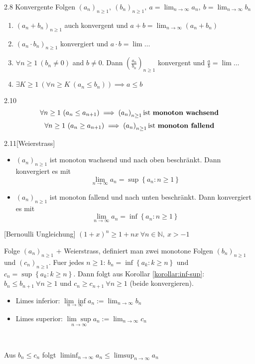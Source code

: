 \documentclass[8pt,a4paper,twocolumn,table]{extarticle}
\newcommand{\N}{\mathbb{N}}
\newcommand{\seq}[1]{\left( #1_n \right)_{n \ge 1}}
\begin{document}
\begin{satz}{2.8}
    Konvergente Folgen $\seq{a},\ \seq{b},\ a = \lim_{n \to \infty} a_n,\ b = \lim_{n \to \infty} b_n$
    \begin{enumerate}
        \item $(a_n + b_n)_{n \ge 1}$ auch konvergent und $a + b = \lim_{n \to \infty} (a_n + b_n)$
        \item $(a_n \cdot b_n)_{n \ge 1}$ konvergiert und $a \cdot b = \lim \dots$
        \item $\forall n \ge 1\ (b_n \ne 0)$ and $b \ne 0$. Dann $\left(\frac{a_n}{b_n}\right)_{n \ge 1}$ konvergent und $\frac{a}{b} = \lim \dots$
        \item $\exists K \ge 1\ \left(\forall n \ge K\ (a_n \le b_n)\right) \implies a \le b$
    \end{enumerate}
\end{satz}

\begin{definition}{2.10}
    \[\forall n \ge 1\ (a_n \le a_{n + 1}) \implies \seq{a} \mbox{ist \textbf{monoton wachsend}}\]
    \[\forall n \ge 1\ (a_n \ge a_{n + 1}) \implies \seq{a} \mbox{ist \textbf{monoton fallend}}\]
\end{definition}

\begin{satz}{2.11}[Weierstrass]
    \begin{itemize}
        \item $\seq{a}$ ist monoton wachsend und nach oben beschränkt. Dann konvergiert es mit \[ \lim_{n \to \infty} a_n = \sup \left\{ a_n : n \ge 1 \right\} \]
        \item $\seq{a}$ ist monoton fallend und nach unten beschränkt. Dann konvergiert es mit \[ \lim_{n \to \infty} a_n = \inf \left\{ a_n : n \ge 1 \right\} \]
    \end{itemize}
\end{satz}

\begin{lemma}{}[Bernoulli Ungleichung]
    $(1 + x)^n \ge 1 + nx\ \forall n \in \N,\ x > -1$
\end{lemma}

\begin{definition}
    Folge $\seq{a}$ + Weierstrass, definiert man zwei monotone Folgen $\seq{b}$ und $\seq{c}$.
    Fuer jedes $n \ge 1$: $b_n = \inf \left\{ a_k : k \ge n \right\}$ und $c_n = \sup \left\{ a_k : k \ge n \right\}$.
    Dann folgt aus Korollar \ref{korollar:inf-sup}:
    $b_n \le b_{n + 1}\ \forall n \ge 1$ und $c_n \ge c_{n + 1}\ \forall n \ge 1$ (beide konvergieren).

    \begin{itemize}
        \item Limes inferior: $\underset{n \to \infty}{\lim \inf} a_n := \lim_{n \to \infty} b_n$
        \item Limes superior: $\underset{n \to \infty}{\lim \sup} a_n := \lim_{n \to \infty} c_n$
    \end{itemize}\

    Aus $b_n \le c_n$ folgt $\liminf_{n \to \infty} a_n \le \limsup_{n \to \infty} a_n$
\end{definition}
\end{document}
